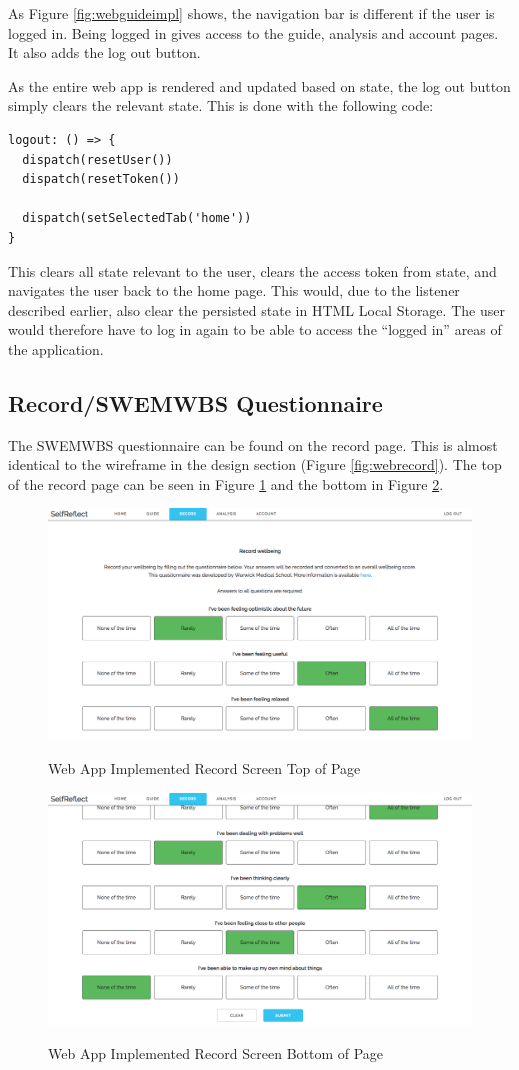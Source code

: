\documentclass[11pt,openright,a4paper]{report}
\begin{document}
\newpage
As Figure \ref{fig:webguideimpl} shows, the navigation bar is different if the user is logged in. Being logged in gives access to the guide, analysis and account pages. It also adds the log out button.

As the entire web app is rendered and updated based on state, the log out button simply clears the relevant state. This is done with the following code:
\begin{lstlisting}
logout: () => {
  dispatch(resetUser())
  dispatch(resetToken())

  dispatch(setSelectedTab('home'))
}
\end{lstlisting}

This clears all state relevant to the user, clears the access token from state, and navigates the user back to the home page. This would, due to the listener described earlier, also clear the persisted state in HTML Local Storage. The user would therefore have to log in again to be able to access the \enquote{logged in} areas of the application.

\subsection{Record/SWEMWBS Questionnaire}
The SWEMWBS questionnaire can be found on the record page. This is almost identical to the wireframe in the design section (Figure \ref{fig:webrecord}). The top of the record page can be seen in Figure \ref{fig:webrecordimpltop} and the bottom in Figure \ref{fig:webrecordimplbottom}.

\begin{figure}[ht]
\centering
\caption{Web App Implemented Record Screen Top of Page}
\includegraphics[width=.75\textwidth]{i/webrecordimpltop.png}
\label{fig:webrecordimpltop}
\end{figure}

\begin{figure}[ht]
\centering
\caption{Web App Implemented Record Screen Bottom of Page}
\includegraphics[width=.75\textwidth]{i/webrecordimplbottom.png}
\label{fig:webrecordimplbottom}
\end{figure}
\end{document}
